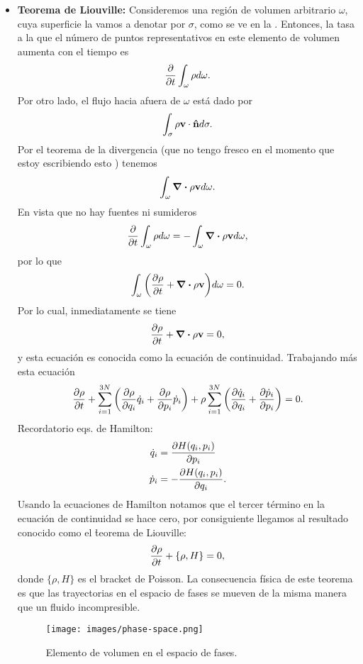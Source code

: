\begin{itemize}
	\item \textbf{Teorema de Liouville:} Consideremos una región de
	volumen arbitrario $\omega$, cuya superficie la vamos a denotar
	por $\sigma$, como se ve en la . 
	Entonces, la tasa a la que el número de puntos 
	representativos en este elemento de volumen aumenta con 
	el tiempo es
	\begin{align}
	\pdv{t}\int_{\omega} \rho d\omega.
	\end{align}
	Por otro lado, el flujo hacia afuera de $\omega$ está dado por 
	\begin{align}
	\int _{\sigma}\rho \vb{v}\cdot \vb{\hat{n}}d\sigma.
	\end{align}
	Por el teorema de la divergencia (que no tengo fresco en el momento
	que estoy escribiendo esto ) tenemos 
	\begin{align}
	\int _\omega \div{\rho \vb{v}}d\omega.
	\end{align}
	En vista que no hay fuentes ni sumideros
	\begin{align}
	\pdv{t}\int_{\omega} \rho d\omega=-\int _\omega \div{\rho \vb{v}}d\omega,
	\end{align}
	por lo que 
	\begin{align}
	\int _{\omega}\qty(\pdv{\rho}{t}+\div{\rho\vb{v}})d\omega=0.
	\end{align}
	Por lo cual, inmediatamente se tiene 
	\begin{align}
	\pdv{\rho}{t}+\div{\rho\vb{v}}=0,
	\end{align}
	y esta ecuación es conocida como la ecuación de continuidad. 
	Trabajando más esta ecuación 
	\begin{align}
	\pdv{\rho}{t}+\sum_{i=1}^{3N}
	\qty(\pdv{\rho}{q_i}\dot{q}_i+\pdv{\rho}{p_i}\dot{p}_i)+
	\rho \sum_{i=1}^{3N}
	\qty(\pdv{\dot{q}_i}{q_i} + \pdv{\dot{p}_i}{p_i})=0.
	\end{align}
	\h{Recordatorio eqs. de Hamilton:} 
	\begin{align}
	\dot{q}_i&=\pdv{H(q_i,p_i)}{p_i}\\
	\dot{p}_i&=-\pdv{H(q_i,p_i)}{q_i}.
	\end{align}
	Usando la ecuaciones de Hamilton notamos que 
	el tercer término en la ecuación de continuidad se hace cero,
	por consiguiente llegamos al resultado 
	conocido como el \h{teorema de Liouville}:
	\begin{align}
	\pdv{\rho}{t}+\{\rho,H\}=0,
	\end{align}
	donde $\{\rho,H\}$ es el bracket de Poisson. La consecuencia 
	física de este teorema es que las trayectorias en el espacio de 
	fases se mueven de la misma manera que un fluido 
	incompresible.
	\begin{figure}
	  \centering
	  \texttt{[image: images/phase-space.png]}
	  \caption{Elemento de volumen en el espacio de fases.}
	  \label{fig:liouville}
	\end{figure}
	

\end{itemize}

